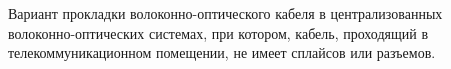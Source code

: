 Вариант прокладки волоконно-оптического кабеля в 
централизованных волоконно-оптических системах, при котором, 
кабель, проходящий в телекоммуникационном помещении, не имеет
сплайсов или разъемов.